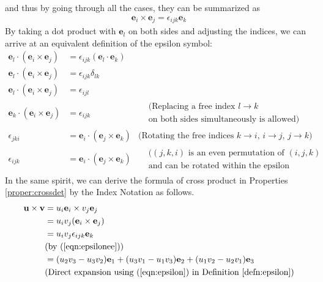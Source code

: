 and thus by going through all the cases, they can be summarized as
\begin{align}
\textbf{e}_i \times \textbf{e}_j= \epsilon_{ijk} \textbf{e}_k \label{eqn:epsilonee}
\end{align}
By taking a dot product with $\textbf{e}_l$ on both sides and adjusting the indices, we can arrive at an equivalent definition of the epsilon symbol:
\begin{align}
\textbf{e}_l \cdot (\textbf{e}_i \times \textbf{e}_j) &= \epsilon_{ijk} (\textbf{e}_l \cdot \textbf{e}_k)  \nonumber \\
\textbf{e}_l \cdot (\textbf{e}_i \times \textbf{e}_j) &= \epsilon_{ijk} \delta_{lk} \nonumber \\
\textbf{e}_l \cdot (\textbf{e}_i \times \textbf{e}_j) &= \epsilon_{ijl} \nonumber \\
\textbf{e}_k \cdot (\textbf{e}_i \times \textbf{e}_j) &= \epsilon_{ijk} \nonumber & \begin{aligned}
&\text{(Replacing a free index $l \to k$} \\
&\text{on both sides simultaneously is allowed)}     
\end{aligned} \\
\epsilon_{jki} &= \textbf{e}_i \cdot (\textbf{e}_j \times \textbf{e}_k) & \text{(Rotating the free indices $k \to i$, $i \to j$, $j \to k$)}  \nonumber \\
\epsilon_{ijk} &= \textbf{e}_i \cdot (\textbf{e}_j \times \textbf{e}_k) 
&\begin{aligned}
&\text{($(j,k,i)$ is an even permutation of $(i,j,k)$} \\
&\text{and can be rotated within the epsilon symbol)}    
\end{aligned} 
\end{align}
In the same spirit, we can derive the formula of cross product in Properties \ref{proper:crossdet} by the Index Notation as follows.
\begin{align}
\textbf{u} \times \textbf{v} &= u_i\textbf{e}_i \times v_j\textbf{e}_j \nonumber \\
&= u_iv_j (\textbf{e}_i \times \textbf{e}_j) \nonumber \\
&= u_iv_j \epsilon_{ijk} \textbf{e}_k \label{eqn:crossind} \\
& \text{(by (\ref{eqn:epsilonee}))} \nonumber \\
&= (u_2v_3 - u_3v_2)\textbf{e}_1 + (u_3v_1 - u_1v_3)\textbf{e}_2 + (u_1v_2 - u_2v_1)\textbf{e}_3 \nonumber \\
& \text{(Direct expansion using (\ref{eqn:epsilon}) in Definition \ref{defn:epsilon})} \nonumber
\end{align}
